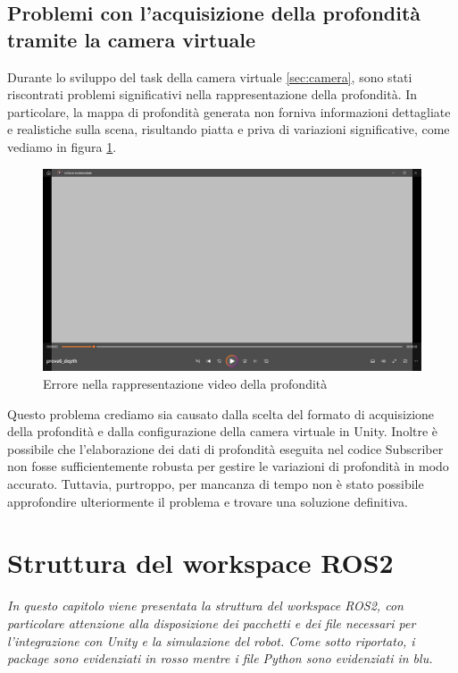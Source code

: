 \documentclass[11pt]{report}
\begin{document}
\section{Problemi con l'acquisizione della profondità tramite la camera virtuale}
\label{sec:Problemi_camera_virtuale}
Durante lo sviluppo del task della camera virtuale \ref{sec:camera}, sono stati riscontrati problemi significativi nella rappresentazione della profondità. In particolare, la mappa di profondità generata non forniva informazioni dettagliate e realistiche sulla scena, risultando piatta e priva di variazioni significative, come vediamo in figura \ref{fig:depth}. 

\begin{figure} [H]
    \centering
    \includegraphics[width=1\textwidth]{images/depth.PNG}
    \caption{Errore nella rappresentazione video della profondità}
    \label{fig:depth}
\end{figure}

Questo problema crediamo sia causato dalla scelta del formato di acquisizione della profondità e dalla configurazione della camera virtuale in Unity. Inoltre è possibile che l'elaborazione dei dati di profondità eseguita nel codice Subscriber non fosse sufficientemente robusta per gestire le variazioni di profondità in modo accurato. Tuttavia, purtroppo, per mancanza di tempo non è stato possibile approfondire ulteriormente il problema e trovare una soluzione definitiva. 

\chapter{Struttura del workspace ROS2}
\textit{In questo capitolo viene presentata la struttura del workspace ROS2, con particolare attenzione alla disposizione dei pacchetti e dei file necessari per l'integrazione con Unity e la simulazione del robot. Come sotto riportato, i package sono evidenziati in rosso mentre i file Python sono evidenziati in blu.}
\end{document}
